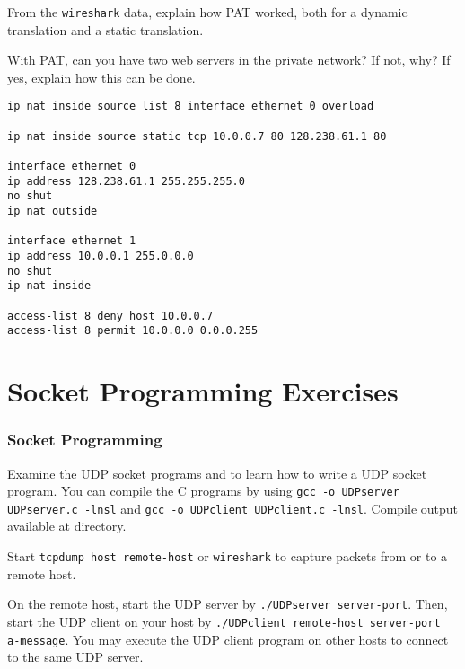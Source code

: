 \documentclass{../UTNetLab}
\begin{document}
    \begin{report}
    \item From the \lstinline{wireshark} data, explain how PAT worked, both for a dynamic translation and a static translation.
    
    \item With PAT, can you have two web servers in the private network?
    If not, why?
    If yes, explain how this can be done.
    \end{report}

    \begin{lstlisting}[language={cisco}, caption={PAT Router Configuration in Fig. 8.7}]
ip nat inside source list 8 interface ethernet 0 overload

ip nat inside source static tcp 10.0.0.7 80 128.238.61.1 80

interface ethernet 0
ip address 128.238.61.1 255.255.255.0
no shut
ip nat outside

interface ethernet 1
ip address 10.0.0.1 255.0.0.0
no shut
ip nat inside

access-list 8 deny host 10.0.0.7
access-list 8 permit 10.0.0.0 0.0.0.255
    \end{lstlisting}

\part{Socket Programming Exercises}
\section{Socket Programming}
    Examine the UDP socket programs  and  to learn how to write a UDP socket program.
    You can compile the C programs by using \lstinline{gcc -o UDPserver UDPserver.c -lnsl} and \lstinline{gcc -o UDPclient UDPclient.c -lnsl}. Compile output available at  directory.

    Start \lstinline[emph={your-host, remote-host}]{tcpdump host remote-host} or \lstinline{wireshark} to capture packets from or to a remote host. 

    On the remote host, start the UDP server by \lstinline[emph={server-port}]{./UDPserver server-port}.
    Then, start the UDP client on your host by \lstinline[emph={your-host, remote-host, server-port, a-message}]{./UDPclient remote-host server-port a-message}.
    You may execute the UDP client program on other hosts to connect to the same UDP server.
\end{document}
